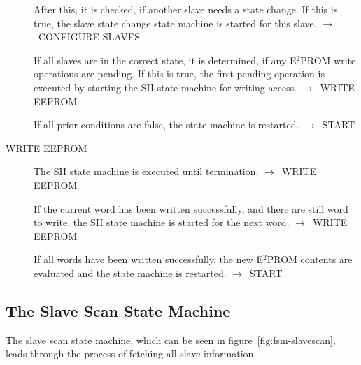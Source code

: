 \documentclass[a4paper,12pt,BCOR6mm,bibtotoc,idxtotoc]{scrbook}
\begin{document}
\begin{description}
  After this, it is checked, if another slave needs a state change. If
  this is true, the slave state change state machine is started for
  this slave. $\rightarrow$~CONFIGURE SLAVES

  If all slaves are in the correct state, it is determined, if any
  E$^2$PROM write operations are pending. If this is true, the first
  pending operation is executed by starting the SII state machine for
  writing access. $\rightarrow$~WRITE EEPROM

  If all prior conditions are false, the state machine is restarted.
  $\rightarrow$~START

\item[WRITE EEPROM] The SII state machine is executed until
  termination. $\rightarrow$~WRITE EEPROM

  If the current word has been written successfully, and there are
  still word to write, the SII state machine is started for the next
  word. $\rightarrow$~WRITE EEPROM

  If all words have been written successfully, the new E$^2$PROM
  contents are evaluated and the state machine is restarted.
  $\rightarrow$~START

\end{description}


\subsection{The Slave Scan State Machine}
\label{sec:fsm-scan}

The slave scan state machine, which can be seen in
figure~\ref{fig:fsm-slavescan}, leads through the process of fetching
all slave information.
\end{document}
